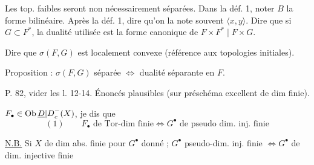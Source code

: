 Les top. faibles seront non nécessairement séparées. Dans la déf. 1, noter $B$ la forme bilinéaire. Après la déf. 1, dire qu'on la note souvent $\langle x,y\rangle$. Dire que si $G\subset F^*$, la dualité utilisée est la forme canonique de $F\times F^*\mid F\times G$.

Dire que $\sigma(F,G)$ est localement convexe (référence aux topologies initiales).

Proposition : $\sigma(F,G)$ séparée $\Longleftrightarrow$ dualité séparante en $F$.

P. 82, vider les l. 12-14.
Énoncés plausibles (sur préschéma excellent de dim finie).

$F_\bullet\in\operatorname{Ob}{\underline{D}|D}_c^-(X)$,  je dis que
\[
(1)\qquad F_\bullet\text{ de Tor-dim finie}\Longleftrightarrow G^{\bullet}\text{ de pseudo dim. inj. finie}
\]
\margin{(**)}

\uline{N.B.} Si $X$ de dim abs. finie  pour $G^{\bullet}$ donné ; $G^{\bullet}$ pseudo-dim. inj. finie $\Longleftrightarrow G^{\bullet}$ de dim. injective finie

